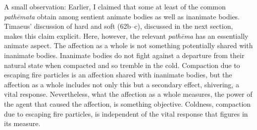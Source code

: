 A small observation: Earlier, I claimed that some at least of the common \emph{pathēmata} obtain among sentient animate bodies as well as inanimate bodies. Timaeus' discussion of hard and soft (62b–c), discussed in the next section, makes this claim explicit. Here, however, the relevant \emph{pathēma} has an essentially animate aspect. The affection as a whole is not something potentially shared with inanimate bodies. Inanimate bodies do not fight against a departure from their natural state when compacted and so tremble in the cold. Compaction due to escaping fire particles is an affection shared with inanimate bodies, but the affection as a whole includes not only this but a secondary effect, shivering, a vital response. Nevertheless, what the affection as a whole measures, the power of the agent that caused the affection, is something objective. Coldness, compaction due to escaping fire particles, is independent of the vital response that figures in its measure.

